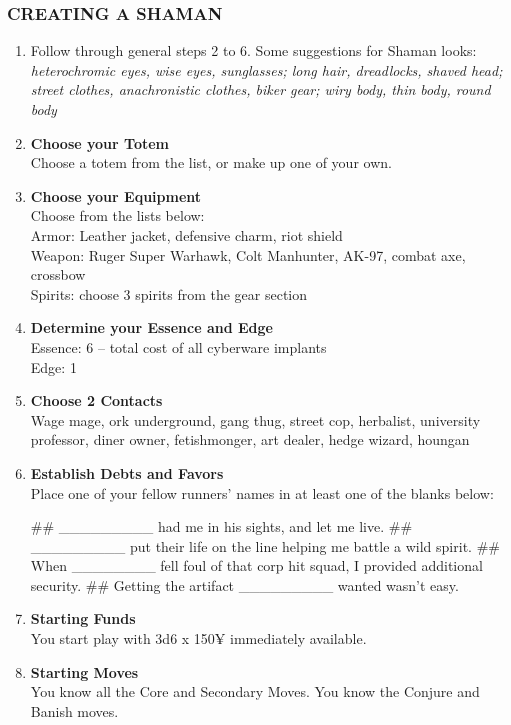 \subsubsection{CREATING A SHAMAN}
\begin{enumerate}
    \item Follow through general steps 2 to 6. Some suggestions for Shaman looks: \textit{heterochromic eyes, wise eyes, sunglasses; long hair, dreadlocks, shaved head; street clothes, anachronistic clothes, biker gear; wiry body, thin body, round body}
    
    \item \textbf{Choose your Totem} \\
    Choose a totem from the list, or make up one of your own.
    
    \item \textbf{Choose your Equipment} \\
    Choose from the lists below: \\
        Armor: Leather jacket, defensive charm, riot shield \\
        Weapon: Ruger Super Warhawk, Colt Manhunter, AK-97, combat axe, crossbow \\
        Spirits: choose 3 spirits from the gear section
    
    \item \textbf{Determine your Essence and Edge} \\
    Essence: 6 – total cost of all cyberware implants \\
    Edge: 1
    
    \item \textbf{Choose 2 Contacts} \\
    Wage mage, ork underground, gang thug, street cop, herbalist, university professor, diner owner, fetishmonger, art dealer, hedge wizard, houngan
    
    \item \textbf{Establish Debts and Favors} \\
    Place one of your fellow runners’ names in at least one of the blanks below:
        \begin{easylist}
            ## \_\_\_\_\_\_\_\_\_ had me in his sights, and let me live.
            ## \_\_\_\_\_\_\_\_\_ put their life on the line helping me battle a wild spirit.
            ## When \_\_\_\_\_\_\_\_ fell foul of that corp hit squad, I provided additional security.
            ## Getting the artifact \_\_\_\_\_\_\_\_\_ wanted wasn’t easy.
        \end{easylist}
    
    \item \textbf{Starting Funds} \\
    You start play with 3d6 x 150¥ immediately available.
    
    \item \textbf{Starting Moves} \\
    You know all the Core and Secondary Moves. You know the Conjure and Banish moves.
\end{enumerate}

